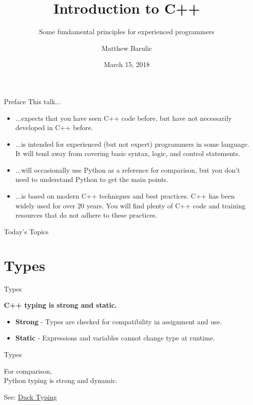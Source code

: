 \documentclass{beamer}
\author{Matthew Barulic}
\date{March 15, 2018}
\title{Introduction to C++}
\subtitle{Some fundamental principles for experienced programmers}
\institute{
	Wheego Technologies
}
\begin{document}
	
	\begin{frame}
		\titlepage
	\end{frame}
	
	\begin{frame}{Preface}
		This talk...
		\begin{itemize}
			\item ...expects that you have seen C++ code before, but have not necessarily developed in C++ before.
			\item ...is intended for experienced (but not expert) programmers in some language. It will tend away from covering basic syntax, logic, and control statements.
			\item ...will occasionally use Python as a reference for comparison, but you don't need to understand Python to get the main points.
			\item ...is based on modern C++ techniques and best practices. C++ has been widely used for over 20 years. You will find plenty of C++ code and training resources that do not adhere to these practices.
		\end{itemize}
	\end{frame}
	
	\begin{frame}{Today's Topics}
		\tableofcontents
	\end{frame}
	
	\section{Types}
	
	\begin{frame}{Types}
		\begin{center}
			\textbf{C++ typing is strong and static.}
		\end{center}
		\bigskip
		\begin{itemize}
			\item \textbf{Strong} - Types are checked for compatibility in assignment and use.
			\item \textbf{Static} - Expressions and variables cannot change type at runtime.
		\end{itemize}
	\end{frame}
	
	\begin{frame}{Types}
		\begin{center}
			For comparison,\\
			Python typing is strong and dynamic. 
		\end{center}
		\bigskip
		\begin{center}
			See: \href{https://en.wikipedia.org/wiki/Duck_typing}{Duck Typing}
		\end{center}
	\end{frame}
	
\end{document}

